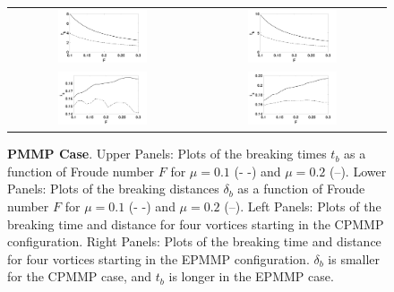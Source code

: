 \documentclass[a4paper,11pt]{article}
\begin{document}
\begin{figure}[!h]
\centering
\begin{tabular}{cc}
\includegraphics[width=0.5\textwidth]{froude_comp_pmmp} & \includegraphics[width=0.5\textwidth]{froude_comp_pmmp_sym}\\
\includegraphics[width=0.5\textwidth]{zmb_pmmp} & \includegraphics[width=0.5\textwidth]{zmb_pmmp_sym}
\end{tabular}
\caption{\small {\bf PMMP Case}. Upper Panels: Plots of the breaking times $t_{b}$ as a function of Froude number $F$ for $\mu=0.1$ (- -) and $\mu=0.2$ (--).  Lower Panels: Plots of the breaking distances $\delta_{b}$ as a function of Froude number $F$ for $\mu=0.1$ (- -) and $\mu=0.2$ (--). Left Panels: Plots of the breaking time and distance for four vortices starting in the CPMMP configuration.  Right Panels: Plots of the breaking time and distance for four vortices starting in the EPMMP configuration.  $\delta_{b}$ is smaller for the CPMMP case, and $t_{b}$ is longer in the EPMMP case.}
\label{fig:froudecomp_pmmp}
\end{figure}
\end{document}
